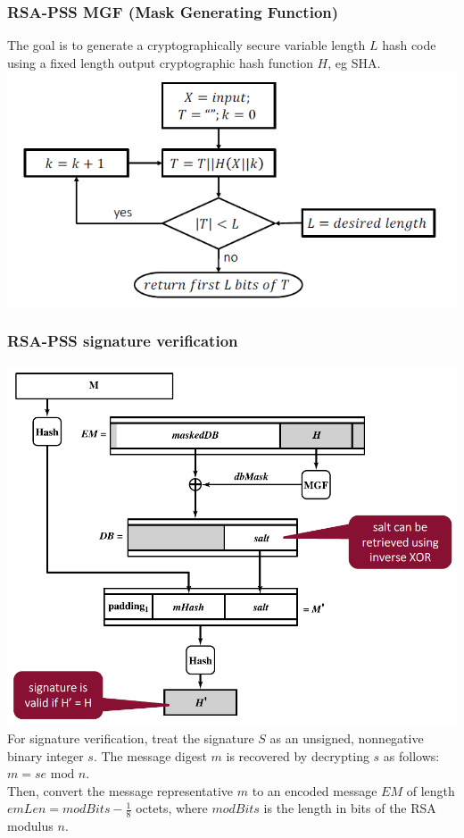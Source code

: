 \documentclass[12pt]{article}
\begin{document}
 \subsubsection{RSA-PSS MGF (Mask Generating Function)}
 The goal is to generate a cryptographically secure variable length $L$ hash code using a fixed length output cryptographic hash function $H$, eg SHA.\\
 \includegraphics[width=0.8\linewidth]{./slides/L4P5RSAPSSMGF.PNG}
 
 \subsubsection{RSA-PSS signature verification}
  \includegraphics[width=0.8\linewidth]{./slides/L4P5RSAPSSSIGVER.PNG}\\
  For signature verification, treat the signature $S$ as an unsigned, nonnegative binary integer $s$. The message digest $m$ is recovered by decrypting $s$ as follows: $m = se \text{ mod } n$.\\
  Then, convert the message representative $m$ to an encoded message $EM$ of length $emLen = modBits -\frac{1}{8}$ octets, where $modBits$ is the length in bits of the RSA modulus $n$.
 
\end{document}
